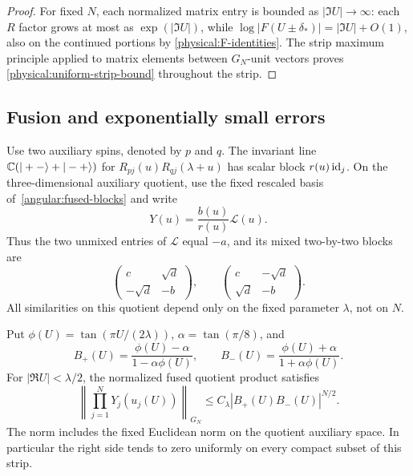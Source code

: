 \begin{proof}
For fixed $N$, each normalized matrix entry is bounded as
$|\Im U|\to\infty$: each $R$ factor grows at most as
$\exp(|\Im U|)$, while
$\log|F(U\pm\delta_*)|=|\Im U|+O(1)$, also on the continued portions by
\eqref{physical:F-identities}. The strip maximum principle applied to
matrix elements between $G_N$-unit vectors proves
\eqref{physical:uniform-strip-bound} throughout the strip.
\end{proof}

\subsection{Fusion and exponentially small errors}
\label{physical:staggered-fusion}

Use two auxiliary spins, denoted by $p$ and $q$. The invariant line
$\mathbb C(|+-\rangle+|-+\rangle)$ for
$R_{pj}(u)R_{qj}(\lambda+u)$ has scalar block $r(u)\operatorname{id}_j$.
On the three-dimensional auxiliary quotient, use the fixed rescaled
basis of~\eqref{angular:fused-blocks} and write
\begin{equation}\label{physical:quotient-Y}
 Y(u)=\frac{b(u)}{r(u)}\mathcal L(u).
\end{equation}
Thus the two unmixed entries of $\mathcal L$ equal $-a$, and its mixed
two-by-two blocks are
\begin{equation}\label{physical:quotient-blocks}
 \begin{pmatrix}c&\sqrt d\\-\sqrt d&-b\end{pmatrix},
 \qquad
 \begin{pmatrix}c&-\sqrt d\\\sqrt d&-b\end{pmatrix}.
\end{equation}
All similarities on this quotient depend only on the fixed parameter
$\lambda$, not on $N$.

\begin{lemma}\label{physical:fusion-bound}
Put $\phi(U)=\tan(\pi U/(2\lambda))$,
$\alpha=\tan(\pi/8)$, and
\begin{equation}\label{physical:two-Blaschke-factors}
 B_+(U)=\frac{\phi(U)-\alpha}{1-\alpha\phi(U)},\qquad
 B_-(U)=\frac{\phi(U)+\alpha}{1+\alpha\phi(U)}.
\end{equation}
For $|\Re U|<\lambda/2$, the normalized fused quotient product satisfies
\begin{equation}\label{physical:fused-error}
 \left\|\prod_{j=1}^NY_j(u_j(U))\right\|_{G_N}
 \le C_\lambda |B_+(U)B_-(U)|^{N/2}.
\end{equation}
The norm includes the fixed Euclidean norm on the quotient auxiliary
space. In particular the right side tends to zero uniformly on every
compact subset of this strip.
\end{lemma}


